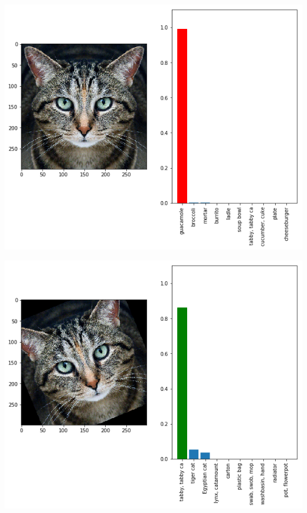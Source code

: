 \documentclass[aspectratio=43,x11names]{beamer}
\begin{document}
\begin{frame}
\includegraphics[scale=0.5]{images/cat_adversarial.png} 
\end{frame}

\begin{frame}
\includegraphics[scale=0.5]{images/cat_rotated.png} 
\end{frame}
\end{document}
